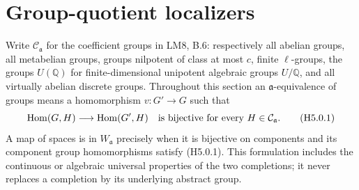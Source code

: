\section{Group-quotient localizers}

Write $\mathcal C_{\mathfrak a}$ for the coefficient groups in LM8,
B.6: respectively all abelian groups, all metabelian groups, groups
nilpotent of class at most $c$, finite $\ell$-groups, the groups
$U(\mathbb Q)$ for finite-dimensional unipotent algebraic groups
$U/\mathbb Q$, and all virtually abelian discrete groups. Throughout
this section an $\mathfrak a$-equivalence of groups means a homomorphism
$v:G'\to G$ such that
\[
 \operatorname{Hom}(G,H)\longrightarrow\operatorname{Hom}(G',H)
       \quad\hbox{is bijective for every }H\in\mathcal C_{\mathfrak a}.
                                                        \tag{H5.0.1}
\]
A map of spaces is in $W_{\mathfrak a}$ precisely when it is bijective
on components and its component group homomorphisms satisfy
(H5.0.1). This formulation includes the continuous or algebraic
universal properties of the two completions; it never replaces a
completion by its underlying abstract group.

